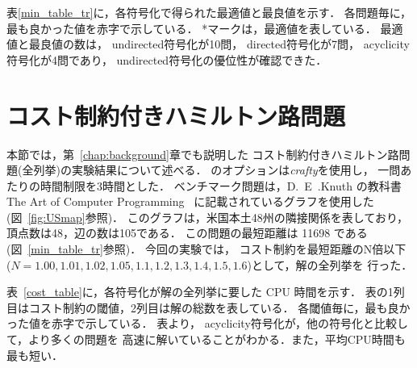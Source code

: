 表\ref{min_table_tr}に，各符号化で得られた最適値と最良値を示す．
各問題毎に，最も良かった値を赤字で示している．
*マークは，最適値を表している．
最適値と最良値の数は，
\textsf{undirected}符号化が10問，
\textsf{directed}符号化が7問，
\textsf{acyclicity}符号化が4問であり，
\textsf{undirected}符号化の優位性が確認できた．


\section{コスト制約付きハミルトン路問題}


本節では，第~\ref{chap:background}章でも説明した
コスト制約付きハミルトン路問題(全列挙)の実験結果について述べる．
{\clingo}のオプションは\textit{crafty}を使用し，
一問あたりの時間制限を3時間とした．
ベンチマーク問題は，D.~E~.Knuth の教科書
The Art of Computer Programming~\cite{Knuth:TAOCP:SAT}
に記載されているグラフを使用した(図~\ref{fig:USmap}参照)．
このグラフは，米国本土48州の隣接関係を表しており，
頂点数は48，辺の数は105である．
この問題の最短距離は 11698 である(図~\ref{min_table_tr}参照)．
今回の実験では，
コスト制約を最短距離のN倍以下
($N=1.00,1.01,1.02,1.05,1.1,1.2,1.3,1.4,1.5,1.6$)として，解の全列挙を
行った．

表~\ref{cost_table}に，各符号化が解の全列挙に要した CPU 時間を示す．
表の1列目はコスト制約の閾値，2列目は解の総数を表している．
各閾値毎に，最も良かった値を赤字で示している．
表より，
\textsf{acyclicity}符号化が，他の符号化と比較して，より多くの問題を
高速に解いていることがわかる．また，平均CPU時間も最も短い．

